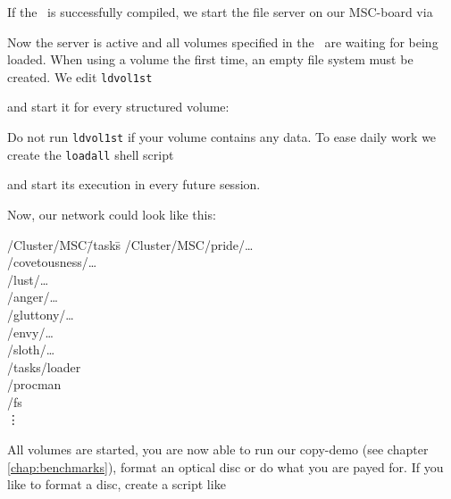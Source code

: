 If the \DI\ is successfully compiled, we start the file server on our
MSC-board via


Now the server is active and all volumes specified in the \DI\ are waiting for
being loaded. When using a volume the first time, an empty file system must be
created. We edit {\tt ldvol1st}




and start it for every structured volume:



\begin{note}
   Do not run {\tt ldvol1st} if your volume contains any data. To ease daily
   work we create the {\tt loadall} shell script


   

   and start its execution in every future session.
\end{note}

Now, our network could look like this:

\begin{tabbing}
/Cluster/MSC\=/tasks\= \kill
/Cluster/MSC/pride/\ldots        \\
         \> /covetousness/\ldots \\
         \> /lust/\ldots         \\
         \> /anger/\ldots        \\
         \> /gluttony/\ldots     \\
         \> /envy/\ldots         \\
         \> /sloth/\ldots        \\
         \> /tasks/loader        \\
         \>    \> /procman       \\
         \>    \> /fs            \\
         \> \vdots               \\
\end{tabbing}

All volumes are started, you are now able to run our copy-demo (see chapter
\ref{chap:benchmarks}), format an optical disc or
do what you are payed for. If you like to format a disc, create a script like

